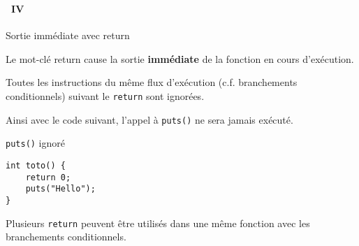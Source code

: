 \begin{frame}[containsverbatim]
  \frametitle{\secname}
  \framesubtitle{\subsecname~IV}

  \begin{alertblock}{Sortie immédiate avec return}
    \par
    Le mot-clé return cause la sortie \textbf{immédiate} de la fonction en cours d'exécution.
    \par
    Toutes les instructions du même flux d'exécution (c.f. branchements conditionnels) suivant le \verb|return| sont ignorées.
  \end{alertblock}
  Ainsi avec le code suivant, l'appel à \verb|puts()| ne sera jamais exécuté.
  \begin{block}{\texttt{puts()} ignoré}
    \begin{verbatim}
int toto() {
    return 0;
    puts("Hello");
}     \end{verbatim}
  \end{block}
  \par
  Plusieurs \verb|return| peuvent être utilisés dans une même fonction avec les branchements conditionnels.
\end{frame}

